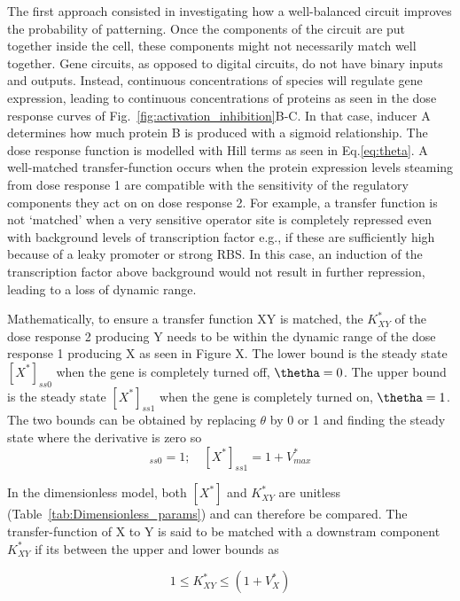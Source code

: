 The first approach consisted in investigating how a well-balanced circuit improves the probability of patterning.
Once the components of the circuit are put together inside the cell, these components might not necessarily match well together.
Gene circuits, as opposed to digital circuits, do not have binary inputs and outputs.
Instead, continuous concentrations of species will regulate gene expression, leading to continuous concentrations of proteins as seen in the dose response curves of Fig.~\ref{fig:activation_inhibition}B-C.
In that case, inducer A determines how much protein B is produced with a sigmoid relationship.
The dose response function is modelled with Hill terms as seen in Eq.\ref{eq:theta}.
A well-matched transfer-function occurs when the protein expression levels steaming from dose response 1 are compatible with the sensitivity of the regulatory components they act on on dose response 2.
For example, a transfer function is not ‘matched’ when a very sensitive operator site is completely repressed even with background levels of transcription factor e.g., if these are sufficiently high because of a leaky promoter or strong RBS.
In this case, an induction of the transcription factor above background would not result in further repression, leading to a loss of dynamic range.

Mathematically, to ensure a transfer function XY is matched, the $K^*_{XY}$ of the dose response 2 producing Y needs to be within the dynamic range of the dose response 1 producing X as seen in Figure X.%
The lower bound is the steady state $[X^*]_{ss0}$ when the gene is completely turned off, $\thetha=0$.
The upper bound is the steady state $[X^*]_{ss1}$ when the gene is completely turned on, $\thetha=1$.
The two bounds can be obtained by replacing $\theta$ by 0 or 1 and finding the steady state where the derivative is zero so
\begin{equation}
    [X^*]_{ss0}=1; \quad [X^*]_{ss1}=1+V^*_{max}
\end{equation}


In the dimensionless model, both $[X^*]$ and  $K^*_{XY}$ are unitless (Table~\ref{tab:Dimensionless_params}) and can therefore be compared.
The transfer-function of X to Y is said to be matched with a downstram component $K^*_{XY}$ if its between the upper and lower bounds as

\begin{equation}
    1 \leq K^*_{XY} \leq (1+V^*_{X})
\end{equation}

